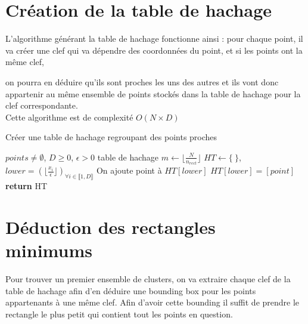 \documentclass[a4paper,english,titlepage]{article}
\begin{document}
	\section{Création de la table de hachage}
L'algorithme générant la table de hachage fonctionne ainsi : pour chaque point, il va créer une clef qui va dépendre des coordonnées du point, et si les points ont la même clef,

on pourra en déduire qu'ils sont proches les uns des autres et ils vont donc appartenir au même ensemble de points stockés dans la table de hachage pour la clef correspondante.\\

Cette algorithme est de complexité $O(N\times D)$
		\begin{algorithm}
		\caption{Créer une table de hachage regroupant des points proches}
	\begin{algorithmic}
		\REQUIRE $points \neq \emptyset$,  $D \geq 0$, $ \epsilon > 0$
		\ENSURE table de hachage
		\STATE $m \leftarrow \lfloor\frac{N}{n_{rect}}\rfloor$
		\STATE $HT \leftarrow \{\ \} $,
		\STATE $lower = (\lfloor \frac{x_i}{\epsilon} \rfloor)_{ \forall i \in \llbracket 1,D \rrbracket}$
		\STATE On ajoute point à $HT[lower]$
		\ELSE 
		\STATE $HT[lower] = [point]$
		\ENDIF
		\ENDFOR
		\STATE \textbf{return} HT
	\end{algorithmic}
	\end{algorithm}


 	\section{Déduction des rectangles minimums}
Pour trouver un premier ensemble de clusters, on va extraire chaque clef de la table de hachage afin d'en déduire une bounding box pour les points appartenants à une même clef.
Afin d'avoir cette bounding il suffit de prendre le rectangle le plus petit qui contient tout les points en question.
\end{document}
